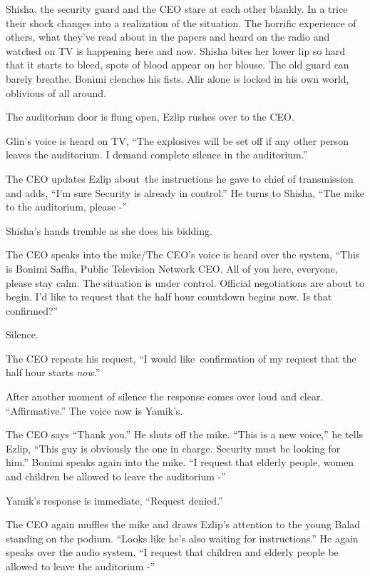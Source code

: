 \documentclass[twoside,11pt]{book}
\begin{document}
Shisha, the security guard and the CEO stare at each other{ }blankly. In a trice
their shock changes into a realization of the situation. The horrific experience of others, what they've read about in
the papers and heard on the radio and watched on TV is happening here and now. Shisha bites her lower lip so hard that
it starts to bleed, spots of blood appear{ }on her blouse. The old guard can
barely breathe. Bonimi clenches his fists. Alir alone is locked in his own world, oblivious of all around.

The auditorium door is flung open, Ezlip rushes over to the CEO.

Glin's voice is heard on TV, ``The explosives will be set off if any other person leaves the auditorium. I
demand complete silence in the auditorium.''

The CEO updates Ezlip about~the instructions he gave to chief of transmission and adds, ``I'm sure Security
is already in control.'' He turns to Shisha, ``The mike to the auditorium, please
-''

Shisha's hands tremble as she does his bidding.

The CEO speaks into the mike/{The CEO's voice is heard over the system},
``This is Bonimi Saffia, Public Television Network CEO. All of you here, everyone, please stay calm. The
situation is under control. Official negotiations are about to{ }begin. I'd
like to request that the half hour{ }countdown{ }begins now. Is that
confirmed?''

Silence.

The CEO repeats his request, ``I would like~confirmation of my request that the half hour starts
\textit{now}.''

After another moment of silence the response comes over loud and clear. ``Affirmative.'' The
voice now is Yamik's.

The CEO says ``Thank you.'' He shuts off the mike. ``This is a new voice,'' he
tells Ezlip, ``This guy is{ }obviously the one in charge. Security must
be{ }looking for him.'' Bonimi speaks again into the{ }mike.
``I request that elderly people, women and children be allowed to leave the auditorium -''

Yamik's response is immediate, ``Request denied.''

The CEO again muffles the mike and draws Ezlip's attention to the young Balad standing on the podium. ``Looks like he's
also waiting for instructions.'' He again speaks over the audio system, ``I request that
children and elderly people be allowed to leave the auditorium -''
\end{document}
